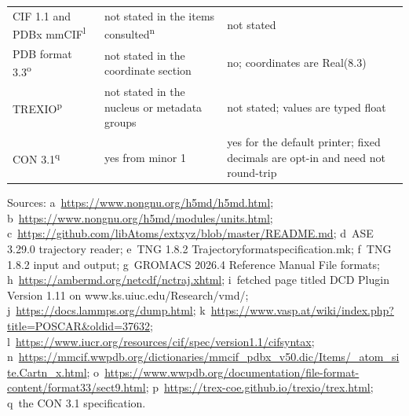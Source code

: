 \begin{table}[tbp]
\begin{tabular}{@{}p{}p{}p{}@{}}
\raggedright CIF 1.1 and PDBx mmCIF\textsuperscript{l} & \raggedright not stated in the items consulted\textsuperscript{n} & \raggedright not stated \tabularnewline
\raggedright PDB format 3.3\textsuperscript{o} & \raggedright not stated in the coordinate section & \raggedright no; coordinates are Real(8.3) \tabularnewline
\raggedright TREXIO\textsuperscript{p} & \raggedright not stated in the nucleus or metadata groups & \raggedright not stated; values are typed float \tabularnewline
\raggedright CON 3.1\textsuperscript{q} & \raggedright yes from minor 1 & \raggedright yes for the default printer; fixed decimals are opt-in and need not round-trip \tabularnewline
\bottomrule
\end{tabular}

\smallskip
\raggedright
Sources: a~\url{https://www.nongnu.org/h5md/h5md.html}; b~\url{https://www.nongnu.org/h5md/modules/units.html}; c~\url{https://github.com/libAtoms/extxyz/blob/master/README.md}; d~ASE 3.29.0 trajectory reader; e~TNG 1.8.2 Trajectoryformatspecification.mk; f~TNG 1.8.2 input and output; g~GROMACS 2026.4 Reference Manual File formats; h~\url{https://ambermd.org/netcdf/nctraj.xhtml}; i~fetched page titled DCD Plugin Version 1.11 on www.ks.uiuc.edu/Research/vmd/; j~\url{https://docs.lammps.org/dump.html}; k~\url{https://www.vasp.at/wiki/index.php?title=POSCAR&oldid=37632}; l~\url{https://www.iucr.org/resources/cif/spec/version1.1/cifsyntax}; n~\url{https://mmcif.wwpdb.org/dictionaries/mmcif_pdbx_v50.dic/Items/_atom_site.Cartn_x.html}; o~\url{https://www.wwpdb.org/documentation/file-format-content/format33/sect9.html}; p~\url{https://trex-coe.github.io/trexio/trex.html}; q~the CON 3.1 specification.
\end{table}
